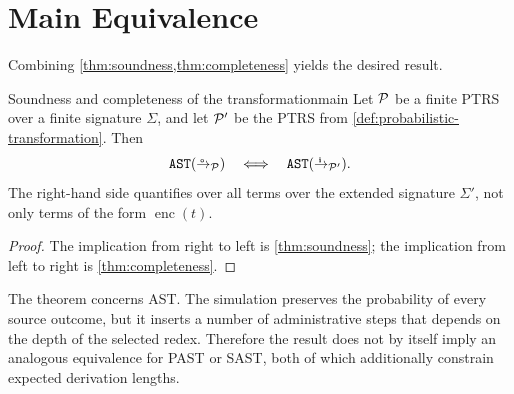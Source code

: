 \section{Main Equivalence}
\label{sec:main-equivalence}

Combining \cref{thm:soundness,thm:completeness} yields the desired result.

\begin{Theorem}{Soundness and completeness of the transformation}{main}
  Let \(\P\) be a finite PTRS over a finite signature \(\Sigma\), and let
  \(\P'\) be the PTRS from
  \cref{def:probabilistic-transformation}.  Then
  \[
    \AST[\oto_{\P}]
      \quad\Longleftrightarrow\quad
    \AST[\ito_{\P'}].
  \]
  The right-hand side quantifies over all terms over the extended signature
  \(\Sigma'\), not only terms of the form \(\operatorname{enc}(t)\).
\end{Theorem}

\begin{proof}
  The implication from right to left is
  \cref{thm:soundness}; the implication from left to right is
  \cref{thm:completeness}.
\end{proof}

The theorem concerns AST.  The simulation preserves the probability of every
source outcome, but it inserts a number of administrative steps that depends on
the depth of the selected redex.  Therefore the result does not by itself imply
an analogous equivalence for PAST or SAST, both of which additionally constrain
expected derivation lengths.
